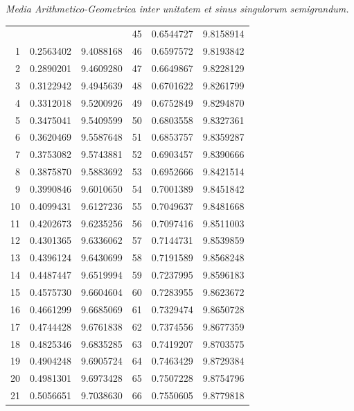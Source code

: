 \clearpage
{}
\begin{center}
\textit{Media Arithmetico-Geometrica inter unitatem et sinus singulorum semigrandum.}\par
\medskip
\begingroup\fontsize{9}{10.2}\selectfont\setlength{\tabcolsep}{4pt}\renewcommand{\arraystretch}{1.0}
\begin{tabular}{||r|r|r||r|r|r||}\hline\hline
 &  &  & 45 & 0.6544727 & 9.8158914 \\
1 & 0.2563402 & 9.4088168 & 46 & 0.6597572 & 9.8193842 \\
2 & 0.2890201 & 9.4609280 & 47 & 0.6649867 & 9.8228129 \\
3 & 0.3122942 & 9.4945639 & 48 & 0.6701622 & 9.8261799 \\
4 & 0.3312018 & 9.5200926 & 49 & 0.6752849 & 9.8294870 \\
5 & 0.3475041 & 9.5409599 & 50 & 0.6803558 & 9.8327361 \\[3pt]
6 & 0.3620469 & 9.5587648 & 51 & 0.6853757 & 9.8359287 \\
7 & 0.3753082 & 9.5743881 & 52 & 0.6903457 & 9.8390666 \\
8 & 0.3875870 & 9.5883692 & 53 & 0.6952666 & 9.8421514 \\
9 & 0.3990846 & 9.6010650 & 54 & 0.7001389 & 9.8451842 \\
10 & 0.4099431 & 9.6127236 & 55 & 0.7049637 & 9.8481668 \\[3pt]
11 & 0.4202673 & 9.6235256 & 56 & 0.7097416 & 9.8511003 \\
12 & 0.4301365 & 9.6336062 & 57 & 0.7144731 & 9.8539859 \\
13 & 0.4396124 & 9.6430699 & 58 & 0.7191589 & 9.8568248 \\
14 & 0.4487447 & 9.6519994 & 59 & 0.7237995 & 9.8596183 \\
15 & 0.4575730 & 9.6604604 & 60 & 0.7283955 & 9.8623672 \\[3pt]
16 & 0.4661299 & 9.6685069 & 61 & 0.7329474 & 9.8650728 \\
17 & 0.4744428 & 9.6761838 & 62 & 0.7374556 & 9.8677359 \\
18 & 0.4825346 & 9.6835285 & 63 & 0.7419207 & 9.8703575 \\
19 & 0.4904248 & 9.6905724 & 64 & 0.7463429 & 9.8729384 \\
20 & 0.4981301 & 9.6973428 & 65 & 0.7507228 & 9.8754796 \\[3pt]
21 & 0.5056651 & 9.7038630 & 66 & 0.7550605 & 9.8779818 \\

\end{tabular}
\end{center}
